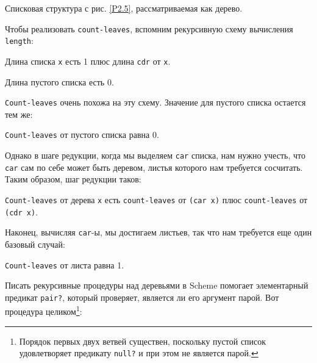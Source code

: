 \begin{cntrfig}

\caption{Списковая структура с рис. \ref{P2.5}, рассматриваемая как дерево.}
\label{P2.6}
\end{cntrfig}


Чтобы реализовать {\tt count-leaves}, вспомним
рекурсивную схему вычисления {\tt length}:

\begin{plainlist}


\item
Длина списка {\tt x} есть 1 плюс длина
{\tt cdr} от {\tt x}.

\item
Длина пустого списка есть 0.
\end{plainlist}
{\tt Count-leaves} очень похожа на эту схему.  Значение для пустого
списка остается тем же:

\begin{plainlist}


\item
{\tt Count-leaves} от пустого списка равна 0.
\end{plainlist}
Однако в шаге редукции, когда мы выделяем {\tt car} списка, нам 
нужно учесть, что {\tt car} сам по себе может быть деревом,
листья которого нам требуется сосчитать.  Таким образом, шаг редукции
таков:

\begin{plainlist}
\item {\tt Count-leaves} от дерева {\tt x}
есть {\tt count-leaves} от {\tt (car x)} плюс
{\tt count-leaves} от {\tt (cdr x)}.
{\sloppy

}
\end{plainlist}
Наконец, вычисляя {\tt car}-ы, мы достигаем листьев, так что нам 
требуется еще один базовый случай:

\begin{plainlist}
\item
{\tt Count-leaves} от листа равна 1.
\end{plainlist}
Писать рекурсивные процедуры над деревьями в Scheme помогает
элементарный предикат {\tt pair?},
который проверяет, является
ли его аргумент парой.  Вот процедура целиком\footnote{Порядок первых
  двух ветвей существен, поскольку пустой 
  список удовлетворяет предикату {\tt null?} и при этом не
  является парой.}:

